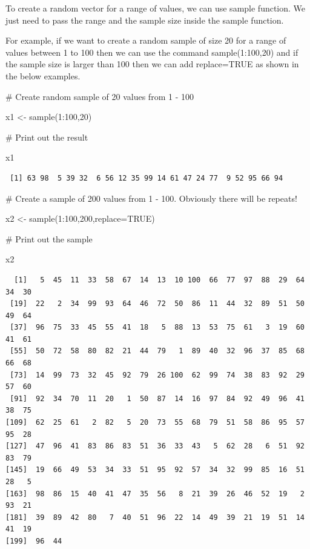 \documentclass[
  letterpaper,
  DIV=11,
  numbers=noendperiod]{scrreprt}
\newenvironment{Shaded}{\begin{snugshade}}{\end{snugshade}}
\newcommand{\AttributeTok}[1]{\textcolor[rgb]{0.40,0.45,0.13}{#1}}
\newcommand{\CommentTok}[1]{\textcolor[rgb]{0.37,0.37,0.37}{#1}}
\newcommand{\ConstantTok}[1]{\textcolor[rgb]{0.56,0.35,0.01}{#1}}
\newcommand{\DecValTok}[1]{\textcolor[rgb]{0.68,0.00,0.00}{#1}}
\newcommand{\FunctionTok}[1]{\textcolor[rgb]{0.28,0.35,0.67}{#1}}
\newcommand{\NormalTok}[1]{\textcolor[rgb]{0.00,0.23,0.31}{#1}}
\newcommand{\OtherTok}[1]{\textcolor[rgb]{0.00,0.23,0.31}{#1}}
\newcommand{\SpecialCharTok}[1]{\textcolor[rgb]{0.37,0.37,0.37}{#1}}
\begin{document}
To create a random vector for a range of values, we can use sample
function. We just need to pass the range and the sample size inside the
sample function.

For example, if we want to create a random sample of size 20 for a range
of values between 1 to 100 then we can use the command sample(1:100,20)
and if the sample size is larger than 100 then we can add replace=TRUE
as shown in the below examples.

\begin{Shaded}
\begin{Highlighting}[]
\CommentTok{\# Create random sample of 20 values from 1 {-} 100}

\NormalTok{x1 }\OtherTok{\textless{}{-}} \FunctionTok{sample}\NormalTok{(}\DecValTok{1}\SpecialCharTok{:}\DecValTok{100}\NormalTok{,}\DecValTok{20}\NormalTok{)}

\CommentTok{\# Print out the result}

\NormalTok{x1}
\end{Highlighting}
\end{Shaded}

\begin{verbatim}
 [1] 63 98  5 39 32  6 56 12 35 99 14 61 47 24 77  9 52 95 66 94
\end{verbatim}

\begin{Shaded}
\begin{Highlighting}[]
\CommentTok{\# Create a sample of 200 values from 1 {-} 100. Obviously there will be repeats!}

\NormalTok{x2 }\OtherTok{\textless{}{-}} \FunctionTok{sample}\NormalTok{(}\DecValTok{1}\SpecialCharTok{:}\DecValTok{100}\NormalTok{,}\DecValTok{200}\NormalTok{,}\AttributeTok{replace=}\ConstantTok{TRUE}\NormalTok{)}

\CommentTok{\# Print out the sample}

\NormalTok{x2}
\end{Highlighting}
\end{Shaded}

\begin{verbatim}
  [1]   5  45  11  33  58  67  14  13  10 100  66  77  97  88  29  64  34  30
 [19]  22   2  34  99  93  64  46  72  50  86  11  44  32  89  51  50  49  64
 [37]  96  75  33  45  55  41  18   5  88  13  53  75  61   3  19  60  41  61
 [55]  50  72  58  80  82  21  44  79   1  89  40  32  96  37  85  68  66  68
 [73]  14  99  73  32  45  92  79  26 100  62  99  74  38  83  92  29  57  60
 [91]  92  34  70  11  20   1  50  87  14  16  97  84  92  49  96  41  38  75
[109]  62  25  61   2  82   5  20  73  55  68  79  51  58  86  95  57  95  28
[127]  47  96  41  83  86  83  51  36  33  43   5  62  28   6  51  92  83  79
[145]  19  66  49  53  34  33  51  95  92  57  34  32  99  85  16  51  28   5
[163]  98  86  15  40  41  47  35  56   8  21  39  26  46  52  19   2  93  21
[181]  39  89  42  80   7  40  51  96  22  14  49  39  21  19  51  14  41  19
[199]  96  44
\end{verbatim}
\end{document}
